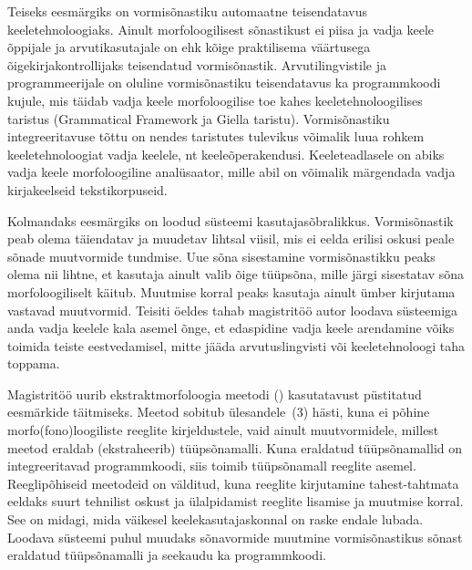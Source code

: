 \documentclass[12pt,a4paper]{article}
\begin{document}
Teiseks eesmärgiks on vormisõnastiku automaatne teisendatavus keele\-tehnoloogiaks. Ainult morfoloogilisest sõnastikust ei piisa ja vadja keele õppijale ja arvuti\-kasutajale on ehk kõige praktilisema väärtusega õigekirja\-kontrollijaks teisendatud vormi\-sõnastik. Arvuti\-lingvistile ja programmeerijale on oluline  vormi\-sõnastiku teisendatavus ka programm\-koodi kujule, mis täidab vadja keele morfoloogilise toe kahes keele\-tehnoloogilises taristus (Grammatical Framework ja Giella taristu). Vormi\-sõnastiku integreeritavuse tõttu on nendes taristutes tulevikus võimalik luua rohkem keeletehnoloogiat vadja keelele, nt keeleõpe\-rakendusi. Keele\-teadlasele on abiks vadja keele morfoloogiline analüsaator, mille abil on võimalik märgendada vadja kirja\-keelseid teksti\-korpuseid.

Kolmandaks eesmärgiks on loodud süsteemi kasutaja\-sõbralikkus. Vormi\-sõnastik peab olema täiendatav ja muudetav lihtsal viisil, mis ei eelda erilisi oskusi peale sõnade muut\-vormide tundmise. Uue sõna sisestamine vormi\-sõnastikku peaks olema nii lihtne, et kasutaja ainult valib õige tüüpsõna, mille järgi sisestatav sõna morfoloogiliselt käitub. Muutmise korral peaks kasutaja ainult ümber kirjutama vastavad muut\-vormid. Teisiti öeldes tahab magistritöö autor loodava süsteemiga anda vadja keelele kala asemel õnge,
et edaspidine vadja keele arendamine võiks toimida teiste eest\-vedamisel, mitte jääda arvutus\-lingvisti või keele\-tehnoloogi taha toppama.

Magistritöö uurib ekstrakt\-morfoloogia meetodi (\cite{ahlberg_semi-supervised_2014}) kasutatavust püstitatud eesmärkide täitmiseks. Meetod sobitub ülesandele~(3) hästi, kuna ei põhine morfo(fono)loogiliste reeglite kirjeldustele, vaid ainult muut\-vormidele, millest meetod eraldab (ekstraheerib) tüüpsõna\-malli. Kuna eraldatud tüüpsõna\-mallid on integreeritavad programm\-koodi, siis toimib tüüp\-sõna\-mall reeglite asemel. %
Reegli\-põhiseid meetodeid on välditud, kuna reeglite kirjutamine tahest-tahtmata eeldaks suurt tehnilist oskust ja ülalpidamist reeglite lisamise ja muutmise korral. See on midagi, mida väikesel keele\-kasutajas\-konnal on raske endale lubada. Loodava süsteemi puhul muudaks sõnavormide muutmine vormisõnastikus sõnast eraldatud tüüpsõna\-malli ja seekaudu ka programm\-koodi.
\end{document}
